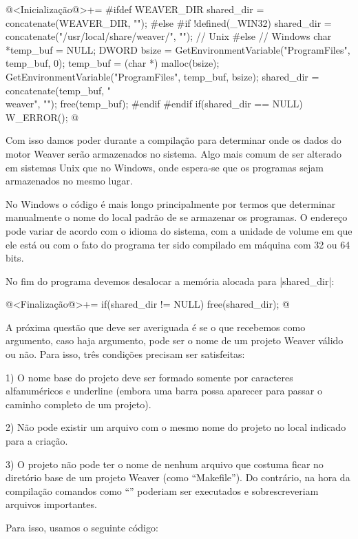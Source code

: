 {@<Inicialização@>+=
{
#ifdef WEAVER_DIR
  shared_dir = concatenate(WEAVER_DIR, "");
#else
#if !defined(_WIN32)
  shared_dir = concatenate("/usr/local/share/weaver/", ""); // Unix
#else
  { // Windows
    char *temp_buf = NULL;
    DWORD bsize = GetEnvironmentVariable("ProgramFiles", temp_buf, 0);
    temp_buf = (char *) malloc(bsize);
    GetEnvironmentVariable("ProgramFiles", temp_buf, bsize);
    shared_dir = concatenate(temp_buf, "\\weaver", "");
    free(temp_buf);
  }
#endif
#endif
  if(shared_dir == NULL) W_ERROR();
}
@
\fimcodigo

Com isso damos poder durante a compilação para determinar onde os
dados do motor Weaver serão armazenados no sistema. Algo mais comum de
ser alterado em sistemas Unix que no Windows, onde espera-se que os
programas sejam armazenados no mesmo lugar.

No Windows o código é mais longo principalmente por termos que
determinar manualmente o nome do local padrão de se armazenar os
programas. O endereço pode variar de acordo com o idioma do sistema,
com a unidade de volume em que ele está ou com o fato do programa ter
sido compilado em máquina com 32 ou 64 bits.

No fim do programa devemos desalocar a memória alocada para
|shared_dir|:

\iniciocodigo
@<Finalização@>+=
if(shared_dir != NULL) free(shared_dir);
@
\fimcodigo


A próxima questão que deve ser averiguada é se o que recebemos como
argumento, caso haja argumento, pode ser o nome de um projeto Weaver
válido ou não. Para isso, três condições precisam ser
satisfeitas:

1) O nome base do projeto deve ser formado somente por caracteres
alfanuméricos e underline (embora uma barra possa aparecer para passar
o caminho completo de um projeto).

2) Não pode existir um arquivo com o mesmo nome do projeto no local
indicado para a criação.

3) O projeto não pode ter o nome de nenhum arquivo que costuma ficar
no diretório base de um projeto Weaver (como ``Makefile''). Do
contrário, na hora da compilação comandos como ``'' poderiam ser executados e sobrescreveriam
arquivos importantes.

Para isso, usamos o seguinte código:

}
